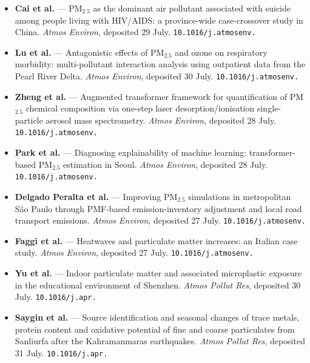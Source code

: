 \documentclass[10pt]{article}
\begin{document}
\vspace{2mm}
\footnotesize
\begin{itemize}\setlength{\itemsep}{1.4mm}
\item \textbf{Cai et al.} --- PM$_{2.5}$ as the dominant air pollutant associated with
suicide among people living with HIV/AIDS: a province-wide case-crossover study in China.
\textit{Atmos Environ}, deposited 29 July.
\texttt{10.1016/\allowbreak j.atmosenv.}

\item \textbf{Lu et al.} --- Antagonistic effects of PM$_{2.5}$ and ozone on respiratory
morbidity: multi-pollutant interaction analysis using outpatient data from the Pearl
River Delta. \textit{Atmos Environ}, deposited 30 July.
\texttt{10.1016/\allowbreak j.atmosenv.}

\item \textbf{Zheng et al.} --- Augmented transformer framework for quantification of
PM$_{2.5}$ chemical composition via one-step laser desorption/ionisation single-particle
aerosol mass spectrometry. \textit{Atmos Environ}, deposited 28 July.
\texttt{10.1016/\allowbreak j.atmosenv.}

\item \textbf{Park et al.} --- Diagnosing explainability of machine learning:
transformer-based PM$_{2.5}$ estimation in Seoul. \textit{Atmos Environ}, deposited
28 July. \texttt{10.1016/\allowbreak j.atmosenv.}

\item \textbf{Delgado Peralta et al.} --- Improving PM$_{2.5}$ simulations in
metropolitan S\~{a}o Paulo through PMF-based emission-inventory adjustment and local road
transport emissions. \textit{Atmos Environ}, deposited 27 July.
\texttt{10.1016/\allowbreak j.atmosenv.}

\item \textbf{Faggi et al.} --- Heatwaves and particulate matter increases: an Italian
case study. \textit{Atmos Environ}, deposited 27 July.
\texttt{10.1016/\allowbreak j.atmosenv.}

\item \textbf{Yu et al.} --- Indoor particulate matter and associated microplastic
exposure in the educational environment of Shenzhen. \textit{Atmos Pollut Res},
deposited 30 July. \texttt{10.1016/\allowbreak j.apr.}

\item \textbf{Saygin et al.} --- Source identification and seasonal changes of trace
metals, protein content and oxidative potential of fine and coarse particulates from
Sanliurfa after the Kahramanmaras earthquakes. \textit{Atmos Pollut Res}, deposited
31 July. \texttt{10.1016/\allowbreak j.apr.}
\end{itemize}
\end{document}
